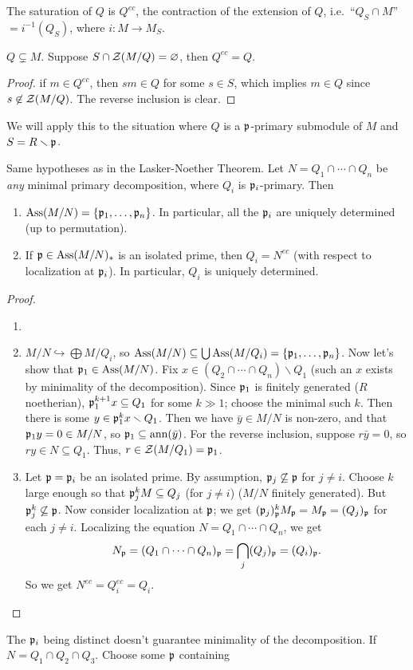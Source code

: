  \begin{exercise}
   The saturation of $Q$ is $Q^{ec}$, the contraction of the extension of $Q$, i.e.\
   ``$Q_S\cap M$''$=i^{-1}(Q_S)$, where $i:M\to M_S$.
 \end{exercise}
 \begin{lemma}
   $Q\subsetneq M$. Suppose $S\cap \mathcal{Z}(M/Q)=\varnothing$, then $Q^{ec}=Q$.
 \end{lemma}
 \begin{proof}
   if $m\in Q^{ec}$, then $sm\in Q$ for some $s\in S$, which implies $m\in Q$ since
   $s\not\in \mathcal{Z}(M/Q)$. The reverse inclusion is clear.
 \end{proof}
 We will apply this to the situation where $Q$ is a $\mathfrak{p}$-primary submodule of $M$ and
 $S=R\smallsetminus \mathfrak{p}$.

 \begin{theorem}
   Same hypotheses as in the Lasker-Noether Theorem. Let $N=Q_1\cap \cdots \cap Q_n$ be
   \emph{any} minimal primary decomposition, where $Q_i$ is $\mathfrak{p}_i$-primary. Then
   \begin{enumerate}
     \item $\operatorname{Ass} (M/N) = \{\mathfrak{p}_1,\dots, \mathfrak{p}_n\}$. In particular, all the $\mathfrak{p}_i$ are
     uniquely determined (up to permutation).

     \item If $\mathfrak{p}\in \operatorname{Ass} (M/N)_*$ is an isolated prime, then $Q_i=N^{ec}$ (with respect
     to localization at $\mathfrak{p}_i$). In particular, $Q_i$ is uniquely determined.
   \end{enumerate}
 \end{theorem}
 \begin{proof}
  \begin{enumerate}
   \item[]
   \item
   $M/N\hookrightarrow \bigoplus M/Q_i$, so
   $\operatorname{Ass}(M/N)\subseteq \bigcup \operatorname{Ass} (M/Q_i) = \{\mathfrak{p}_1,\dots, \mathfrak{p}_n\}$.
   Now let's show that $\mathfrak{p}_1\in \operatorname{Ass} (M/N)$. Fix $x\in
   (Q_2\cap\cdots \cap Q_n)\smallsetminus Q_1$ (such an $x$ exists by minimality of the
   decomposition). Since $\mathfrak{p}_1$ is finitely generated ($R$ noetherian),
   $\mathfrak{p}_1^{k+1}x\subseteq Q_1$ for some $k\gg 1$; choose the minimal such $k$. Then there
   is some $y\in \mathfrak{p}_1^k x\smallsetminus Q_1$. Then we have $\bar y \in M/N$ is non-zero,
   and that $\mathfrak{p}_1 y=0\in M/N$, so $\mathfrak{p}_1\subseteq \operatorname{ann} (\bar y)$. For the reverse
   inclusion, suppose $r\bar y=0$, so $ry\in N\subseteq Q_1$. Thus, $r\in
   \mathcal{Z}(M/Q_1)=\mathfrak{p}_1$.

   \item Let $\mathfrak{p}=\mathfrak{p}_i$ be an isolated prime. By assumption, $\mathfrak{p}_j\not\subseteq \mathfrak{p}$ for
   $j\neq i$. Choose $k$ large enough so that $\mathfrak{p}_j^k M\subseteq Q_j$ (for $j\neq i$)
   ($M/N$ finitely generated). But $\mathfrak{p}_j^k\not\subseteq \mathfrak{p}$. Now consider localization at
   $\mathfrak{p}$; we get $(\mathfrak{p}_j)_{\mathfrak{p}}^k M_{\mathfrak{p}} = M_{\mathfrak{p}} = (Q_j)_{\mathfrak{p}}$ for each $j\neq i$. Localizing the
   equation $N=Q_1\cap \cdots \cap Q_n$, we get
   \[
    N_{\mathfrak{p}}=(Q_1\cap \cdots \cap Q_n)_{\mathfrak{p}} = \bigcap_j (Q_j)_{\mathfrak{p}} = (Q_i)_{\mathfrak{p}}.
   \]
   So we get $N^{ec}=Q_i^{ec} = Q_i$.\qedhere
  \end{enumerate}
 \end{proof}
 \begin{example}
   The $\mathfrak{p}_i$ being distinct doesn't guarantee minimality of the decomposition. If
   $N=Q_1\cap Q_2\cap Q_3$. Choose some $\mathfrak{p}$ containing
 \end{example}
